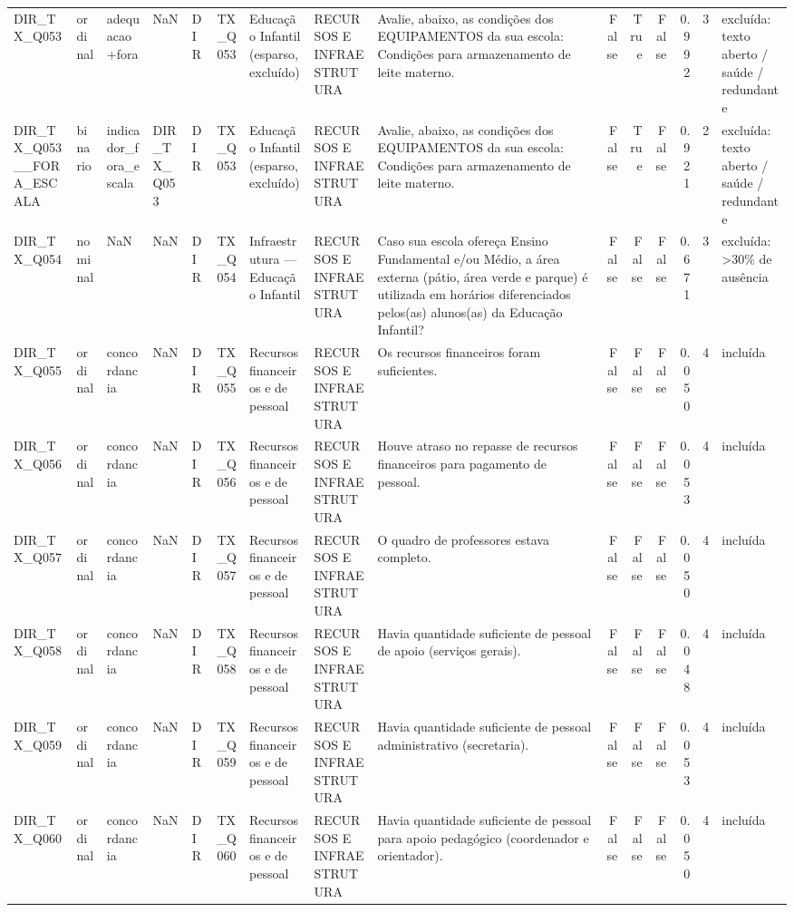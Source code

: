 \begin{tabular}{lllllllllrrrrrl}
DIR\_TX\_Q053 & ordinal & adequacao+fora & NaN & DIR & TX\_Q053 & Educação Infantil (esparso, excluído) & RECURSOS E INFRAESTRUTURA & Avalie, abaixo, as condições dos EQUIPAMENTOS da sua escola: Condições para armazenamento de leite materno. & False & True & False & 0.992 & 3 & excluída: texto aberto / saúde / redundante \\
DIR\_TX\_Q053\_\_FORA\_ESCALA & binario & indicador\_fora\_escala & DIR\_TX\_Q053 & DIR & TX\_Q053 & Educação Infantil (esparso, excluído) & RECURSOS E INFRAESTRUTURA & Avalie, abaixo, as condições dos EQUIPAMENTOS da sua escola: Condições para armazenamento de leite materno. & False & True & False & 0.921 & 2 & excluída: texto aberto / saúde / redundante \\
DIR\_TX\_Q054 & nominal & NaN & NaN & DIR & TX\_Q054 & Infraestrutura — Educação Infantil & RECURSOS E INFRAESTRUTURA & Caso sua escola ofereça Ensino Fundamental e/ou Médio, a área externa (pátio, área verde e parque) é utilizada em horários diferenciados pelos(as) alunos(as) da Educação Infantil? & False & False & False & 0.671 & 3 & excluída: >30\% de ausência \\
DIR\_TX\_Q055 & ordinal & concordancia & NaN & DIR & TX\_Q055 & Recursos financeiros e de pessoal & RECURSOS E INFRAESTRUTURA & Os recursos financeiros foram suficientes. & False & False & False & 0.050 & 4 & incluída \\
DIR\_TX\_Q056 & ordinal & concordancia & NaN & DIR & TX\_Q056 & Recursos financeiros e de pessoal & RECURSOS E INFRAESTRUTURA & Houve atraso no repasse de recursos financeiros para pagamento de pessoal. & False & False & False & 0.053 & 4 & incluída \\
DIR\_TX\_Q057 & ordinal & concordancia & NaN & DIR & TX\_Q057 & Recursos financeiros e de pessoal & RECURSOS E INFRAESTRUTURA & O quadro de professores estava completo. & False & False & False & 0.050 & 4 & incluída \\
DIR\_TX\_Q058 & ordinal & concordancia & NaN & DIR & TX\_Q058 & Recursos financeiros e de pessoal & RECURSOS E INFRAESTRUTURA & Havia quantidade suficiente de pessoal de apoio (serviços gerais). & False & False & False & 0.048 & 4 & incluída \\
DIR\_TX\_Q059 & ordinal & concordancia & NaN & DIR & TX\_Q059 & Recursos financeiros e de pessoal & RECURSOS E INFRAESTRUTURA & Havia quantidade suficiente de pessoal administrativo (secretaria). & False & False & False & 0.053 & 4 & incluída \\
DIR\_TX\_Q060 & ordinal & concordancia & NaN & DIR & TX\_Q060 & Recursos financeiros e de pessoal & RECURSOS E INFRAESTRUTURA & Havia quantidade suficiente de pessoal para apoio pedagógico (coordenador e orientador). & False & False & False & 0.050 & 4 & incluída \\

\end{tabular}
